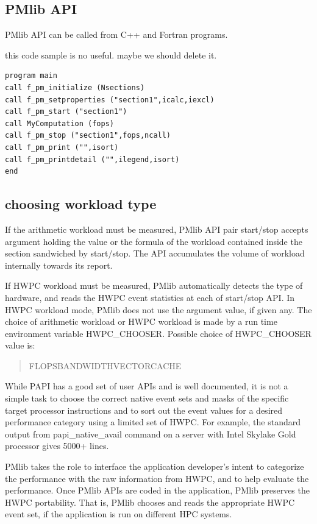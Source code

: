 \documentclass[conference]{IEEEtran}
\begin{document}
\subsection {PMlib API}
PMlib API can be called from C++ and Fortran programs.

{\color{blue} this code sample is no useful. maybe we should delete it. }
\begin{lstlisting}[caption={using PMlib in Fortran program}]
program main
call f_pm_initialize (Nsections)
call f_pm_setproperties ("section1",icalc,iexcl)
call f_pm_start ("section1")
call MyComputation (fops)
call f_pm_stop ("section1",fops,ncall)
call f_pm_print ("",isort)
call f_pm_printdetail ("",ilegend,isort)
end
\end{lstlisting}


\subsection {choosing workload type}
If the arithmetic workload must be measured,
PMlib API pair start/stop accepts argument holding the value or the formula
of the workload contained inside the section sandwiched by start/stop.
The API accumulates the volume of workload internally towards its report.

If HWPC workload must be measured,
PMlib automatically detects the type of hardware, and reads the HWPC
event statistics at each of start/stop API.
In HWPC workload mode, PMlib does not use the argument value, if given any.
The choice of arithmetic workload or HWPC workload is made by a
run time environment variable HWPC\_CHOOSER.
Possible choice of HWPC\_CHOOSER value is:
\begin{quote}
\begin{small}
FLOPS\textbar BANDWIDTH\textbar VECTOR\textbar CACHE
\end{small}
\end{quote}

While PAPI has a good set of user APIs and is well documented,
it is not a simple task to choose the correct native event sets and masks
of the specific target processor instructions and to sort out the event
values for a desired performance category using a limited set of HWPC.
For example,
the standard output from papi\_native\_avail command on a server with
Intel Skylake Gold processor gives 5000+ lines.

PMlib takes the role to interface the application developer's intent to
categorize the performance with the raw information from HWPC, and to
help evaluate the performance.
Once PMlib APIs are coded in the application, PMlib preserves the HWPC
portability. That is, PMlib chooses and reads the appropriate HWPC event
set, if the application is run on different HPC systems.
\end{document}
